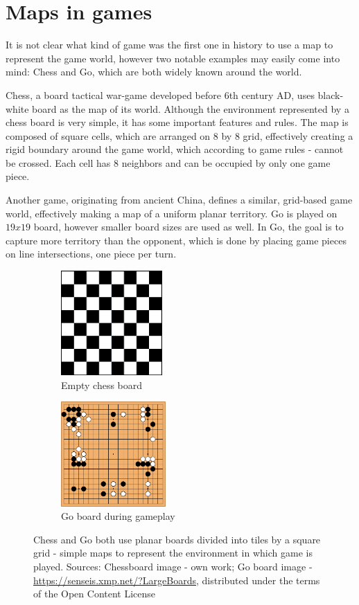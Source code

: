 \documentclass[12pt]{report}
\begin{document}
\section{Maps in games} 

It is not clear what kind of game was the first one in history to use a map to represent the game world, however two notable examples may easily come into mind: Chess and Go, which are both widely known around the world. 

Chess, a board tactical war-game developed before 6th century AD, uses black-white board as the map of its world. Although the environment represented by a chess board is very simple, it has some important features and rules. The map is composed of square cells, which are arranged on 8 by 8 grid, effectively creating a rigid boundary around the game world, which according to game rules - cannot be crossed. Each cell has 8 neighbors and can be occupied by only one game piece.

Another game, originating from ancient China, defines a similar, grid-based game world, effectively making a map of a uniform planar territory. Go is played on $19x19$ board, however smaller board sizes are used as well. In Go, the goal is to capture more territory than the opponent, which is done by placing game pieces on line intersections, one piece per turn.


\begin{figure}[H]
	\centering
	\begin{subfigure}[t]{0.4\linewidth}
		\centering
		\includegraphics[height=4cm]{images/chessboard}
		\caption{Empty chess board} 
	\end{subfigure} \hspace{1em}
	\hfill
	\begin{subfigure}[t]{0.4\linewidth}
		\centering
		\includegraphics[height=4cm]{images/goboard}
		\caption{Go board during gameplay} 
	\end{subfigure} \hspace{1em} 
	\caption{Chess and Go both use planar boards divided into tiles by a square grid - simple maps to represent the environment in which game is played. Sources: Chessboard image - own work; Go board image - \url{https://senseis.xmp.net/?LargeBoards}, distributed under the terms of the Open Content License }
	\label{fig:neighborhood_types}
\end{figure}
 
\end{document}
